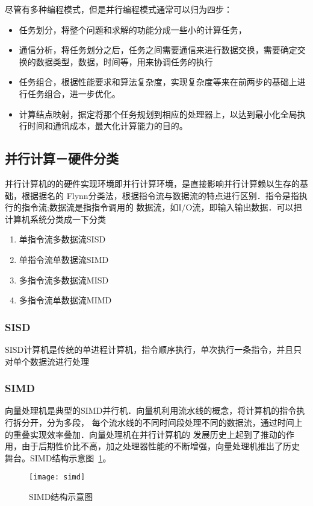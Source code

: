     尽管有多种编程模式，但是并行编程模式通常可以归为四步：
    \begin{itemize}
    \item 任务划分，将整个问题和求解的功能分成一些小的计算任务，
    \item 通信分析，将任务划分之后，任务之间需要通信来进行数据交换，需要确定交换的数据类型，数据，时间等，用来协调任务的执行
    \item 任务组合，根据性能要求和算法复杂度，实现复杂度等来在前两步的基础上进行任务组合，进一步优化。
    \item 计算结点映射，据定将那个任务规划到相应的处理器上，以达到最小化全局执行时间和通讯成本，最大化计算能力的目的。
    \end{itemize}
\subsection{并行计算－硬件分类}
    并行计算机的的硬件实现环境即并行计算环境，是直接影响并行计算赖以生存的基础，根据据名的
Flynn分类法，根据指令流与数据流的特点进行区别．指令是指执行的指令流;数据流是指指令调用的
数据流，如I/O流，即输入输出数据．可以把计算机系统分类成一下分类
    \begin{enumerate}
    \item 单指令流多数据流SISD
    \item 单指令流单数据流SIMD
    \item 多指令流多数据流MISD
    \item 多指令流单数据流MIMD
    \end{enumerate}
\subsubsection{SISD}
    SISD计算机是传统的单进程计算机，指令顺序执行，单次执行一条指令，并且只对单个数据流进行处理
\subsubsection{SIMD}
    向量处理机是典型的SIMD并行机．向量机利用流水线的概念，将计算机的指令执行拆分开，分为多段，
每个流水线的不同时间段处理不同的数据流，通过时间上的重叠实现效率叠加．向量处理机在并行计算机的
发展历史上起到了推动的作用，由于后期性价比不高，加之处理器性能的不断增强，向量处理机推出了历史
舞台。SIMD结构示意图\cite{Hufeng}~\ref{fig:simd}。
    \begin{figure}[htbp]
    \centering
    \texttt{[image: simd]}
    \caption{SIMD结构示意图}\label{fig:simd}
    \vspace{\baselineskip}
    \end{figure}
